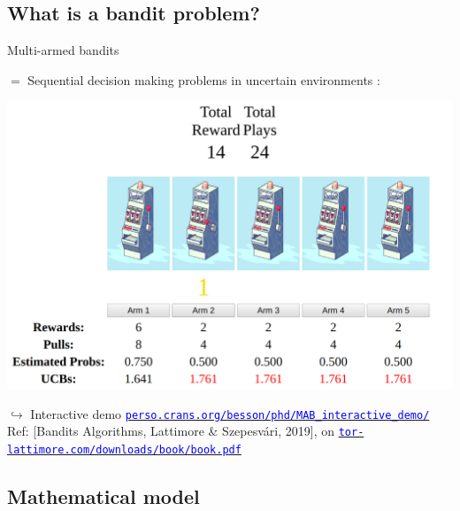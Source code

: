 \documentclass[11pt,english,ignorenonframetext,]{beamer}
\begin{document}
\subsection{\hfill{}What is a bandit problem?\hfill{}}

\begin{frame}{Multi-armed bandits}

  $=$ Sequential decision making problems in uncertain environments :

  \begin{center}
    \includegraphics[height=0.55\textheight]{figures/example_of_a_5_arm_bandit_problem.png}
  \end{center}

  \begin{tiny}
  $\hookrightarrow$ Interactive demo
    \href{https://perso.crans.org/besson/phd/MAB_interactive_demo/}{\textcolor{blue}{\texttt{perso.crans.org/besson/phd/MAB\_interactive\_demo/}}}\\
    Ref: [Bandits Algorithms, Lattimore \& Szepesv{\'a}ri, 2019],
    on \href{https://tor-lattimore.com/downloads/book/book.pdf}{\textcolor{blue}{\texttt{tor-lattimore.com/downloads/book/book.pdf}}}
  \end{tiny}

\end{frame}


\subsection{\hfill{}Mathematical model\hfill{}}
\end{document}
